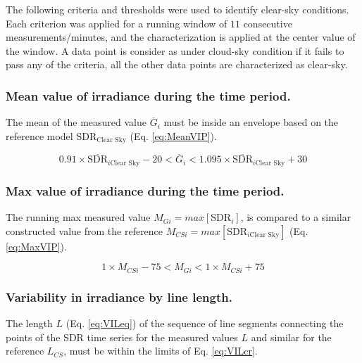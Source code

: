 \documentclass[
  preprint, 3p, authoryear]{article}
\begin{document}
The following criteria and thresholds were used to identify clear-sky conditions.
Each criterion was applied for a running window of \(11\) consecutive measurements/minutes, and the characterization is applied at the center value of the window.
A data point is consider as under cloud-sky condition if it fails to pass any of the criteria, all the other data points are characterized as clear-sky.

\hypertarget{mean-value-of-irradiance-during-the-time-period.}{%
\subsubsection{Mean value of irradiance during the time period.}\label{mean-value-of-irradiance-during-the-time-period.}}

The mean of the measured value \(\overline{G}_i\) must be inside an envelope based on the reference model \(\text{SDR}_\text{Clear Sky}\) (Eq. \ref{eq:MeanVIP}).

\begin{equation}
0.91 \times \overline{\text{SDR}}_{i\text{Clear Sky}} - 20
< \overline{G}_i <
1.095 \times \overline{\text{SDR}}_{i\text{Clear Sky}} + 30
\label{eq:MeanVIP}
\end{equation}

\hypertarget{max-value-of-irradiance-during-the-time-period.}{%
\subsubsection{Max value of irradiance during the time period.}\label{max-value-of-irradiance-during-the-time-period.}}

The running max measured value \(M_{Gi} = max[\text{SDR}_{i}]\), is compared to a similar constructed value from the reference \(M_{CSi} = max[\text{SDR}_{i\text{Clear Sky}}]\) (Eq. \ref{eq:MaxVIP}).

\begin{equation}
1 \times M_{CSi} - 75
< M_{Gi} <
1 \times M_{CSi} + 75
\label{eq:MaxVIP}
\end{equation}

\hypertarget{variability-in-irradiance-by-line-length.}{%
\subsubsection{Variability in irradiance by line length.}\label{variability-in-irradiance-by-line-length.}}

The length \(L\) (Eq. \ref{eq:VILeq}) of the sequence of line segments connecting the points of the SDR time
series for the measured values \(L\) and similar for the reference \(L_{CS}\), must be within the limits of Eq. \ref{eq:VILcr}.
\end{document}
